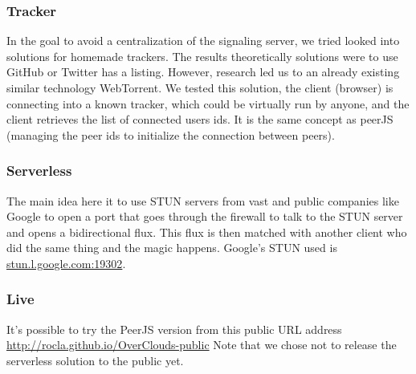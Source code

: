 \subsubsection{Tracker} In the goal to avoid a centralization of the signaling server, we tried looked into solutions for homemade trackers. The results theoretically solutions were to use GitHub or Twitter has a listing. However, research led us to an already existing similar technology WebTorrent\cite{Torrent2015WebTorrent}. We tested this solution, the client (browser) is connecting into a known tracker, which could be virtually run by anyone, and the client retrieves the list of connected users ids. It is the same concept as peerJS (managing the peer ids to initialize the connection between peers).

\subsubsection{Serverless} The main idea here it to use STUN servers from vast and public companies like Google to open a port that goes through the firewall to talk to the STUN server and opens a bidirectional flux. This flux is then matched with another client who did the same thing and the magic happens. Google's STUN used is \url{stun.l.google.com:19302}. 

\subsubsection{Live} It's possible to try the PeerJS version from this public URL address \url{http://rocla.github.io/OverClouds-public}
Note that we chose not to release the serverless solution to the public yet.

